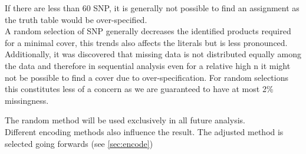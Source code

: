 \documentclass[letterpaper, 11pt]{article}
\begin{document}
If there are less than 60 SNP, it is generally not possible to find an assignment as the truth table would be over-specified. \\

A random selection of SNP generally decreases the identified products required for a minimal cover, this trends also affects the literals but is less pronounced. Additionally, it was discovered that missing data is not distributed equally among the data and therefore in sequential analysis even for a relative high n it might not be possible to find a cover due to over-specification. For random selections this constitutes less of a concern as we are guaranteed to have at most 2\% missingness.  
\begin{figure}[h]
\end{figure}

The random method will be used exclusively in all future analysis. \\


Different encoding methods also influence the result. The adjusted method is selected going forwards (see \ref{sec:encode})
\end{document}
